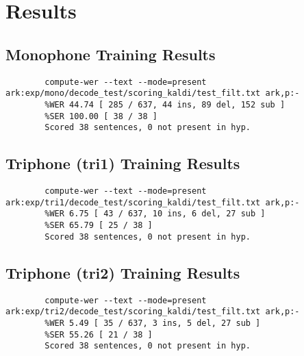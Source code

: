 %
%
%                 

\chapter{Results}
\label{sec:appendixc}

\section*{Monophone Training Results}

{\lstset{
		basicstyle=\ttfamily\small,
		frame=single,
		breaklines=true,
		breakatwhitespace=true,
		columns=fullflexible
	}
	\begin{lstlisting}
		compute-wer --text --mode=present ark:exp/mono/decode_test/scoring_kaldi/test_filt.txt ark,p:- 
		%WER 44.74 [ 285 / 637, 44 ins, 89 del, 152 sub ]
		%SER 100.00 [ 38 / 38 ]
		Scored 38 sentences, 0 not present in hyp.
	\end{lstlisting}
}

\vspace{1em}

\section*{Triphone (tri1) Training Results}

{\lstset{
		basicstyle=\ttfamily\small,
		frame=single,
		breaklines=true,
		breakatwhitespace=true,
		columns=fullflexible
	}
	\begin{lstlisting}
		compute-wer --text --mode=present ark:exp/tri1/decode_test/scoring_kaldi/test_filt.txt ark,p:- 
		%WER 6.75 [ 43 / 637, 10 ins, 6 del, 27 sub ]
		%SER 65.79 [ 25 / 38 ]
		Scored 38 sentences, 0 not present in hyp.
	\end{lstlisting}
}

\vspace{1em}

\section*{Triphone (tri2) Training Results}

{\lstset{
		basicstyle=\ttfamily\small,
		frame=single,
		breaklines=true,
		breakatwhitespace=true,
		columns=fullflexible
	}
	\begin{lstlisting}
		compute-wer --text --mode=present ark:exp/tri2/decode_test/scoring_kaldi/test_filt.txt ark,p:- 
		%WER 5.49 [ 35 / 637, 3 ins, 5 del, 27 sub ]
		%SER 55.26 [ 21 / 38 ]
		Scored 38 sentences, 0 not present in hyp.
	\end{lstlisting}
}
